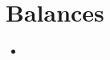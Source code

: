 \documentclass{article}
\begin{document}
\section{}
\section{Balances}
\begin{itemize}
    \item {}
\end{itemize}
\end{document}
